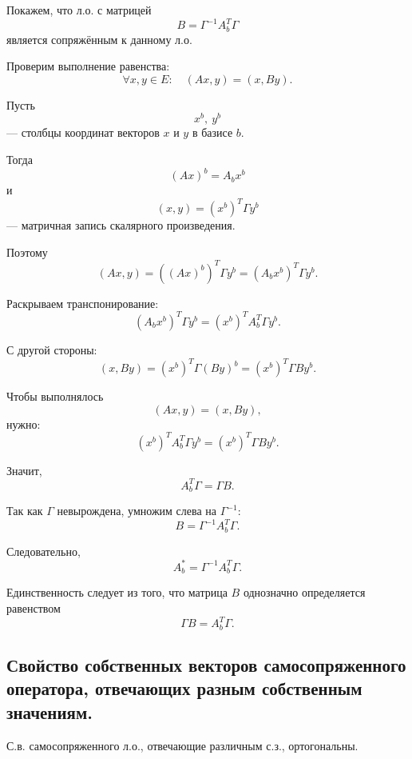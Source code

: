 \begin{Proof}
    Покажем, что л.о. с матрицей
    \[
        B = \Gamma^{-1}A_b^T\Gamma
    \]
    является сопряжённым к данному л.о.

    Проверим выполнение равенства:
    \[
        \forall x,y \in E:\quad (Ax,y) = (x,By).
    \]

    Пусть
    \[
        x^b,\ y^b
    \]
    --- столбцы координат векторов $x$ и $y$ в базисе $b$.

    Тогда
    \[
        (Ax)^b = A_bx^b
    \]
    и
    \[
        (x,y) = (x^b)^T\Gamma y^b
    \]
    --- матричная запись скалярного произведения.

    Поэтому
    \[
        (Ax,y)
        =
        ((Ax)^b)^T\Gamma y^b
        =
        (A_bx^b)^T\Gamma y^b.
    \]

    Раскрываем транспонирование:
    \[
        (A_bx^b)^T\Gamma y^b
        =
        (x^b)^T A_b^T \Gamma y^b.
    \]

    С другой стороны:
    \[
        (x,By)
        =
        (x^b)^T\Gamma(By)^b
        =
        (x^b)^T\Gamma B y^b.
    \]

    Чтобы выполнялось
    \[
        (Ax,y)=(x,By),
    \]
    нужно:
    \[
        (x^b)^T A_b^T\Gamma y^b
        =
        (x^b)^T\Gamma B y^b.
    \]

    Значит,
    \[
        A_b^T\Gamma = \Gamma B.
    \]

    Так как $\Gamma$ невырождена, умножим слева на $\Gamma^{-1}$:
    \[
        B = \Gamma^{-1}A_b^T\Gamma.
    \]

    Следовательно,
    \[
        A_b^* = \Gamma^{-1}A_b^T\Gamma.
    \]

    Единственность следует из того, что матрица $B$ однозначно определяется равенством
    \[
        \Gamma B = A_b^T\Gamma.
    \]
\end{Proof}
\subsection{Свойство собственных векторов самосопряженного оператора, отвечающих разным собственным значениям.}

\begin{theorem}
    С.в. самосопряженного л.о., отвечающие различным с.з., ортогональны.
\end{theorem}

